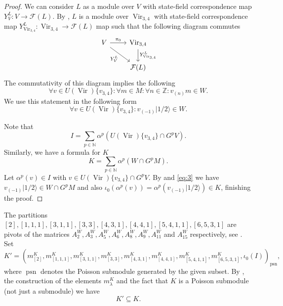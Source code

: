 \documentclass[12pt, a4paper]{article}
\DeclareMathOperator{\Vir}{Vir}
\DeclareMathOperator{\psn}{psn}
\newcommand{\vachalf}{|1/2\rangle}
\begin{document}
\begin{proof}
  We can consider $L$ as a module over $V$ with state-field correspondence map $Y^L_{V}: V \to \mathcal{F}(L)$.
  By \cite[Theorem 4.2.]{wang_rationality_1993}, $L$ is a module over $\Vir_{3,4}$ with state-field correspondence map $Y^L_{\Vir_{3, 4}}: \Vir_{3, 4} \to \mathcal{F}(L)$ map such that the following diagram commutes
  \begin{equation*}
    \begin{tikzcd}
      V \arrow[r, "\pi_0"] \arrow[rd, "{Y^{L}_{V}}"'] & {\Vir_{3, 4}} \arrow[d, "{Y^{L}_{\Vir_{3, 4}}}"] \\
      & {\mathcal{F}(L)}
    \end{tikzcd}
  \end{equation*}
  The commutativity of this diagram implies the following
  \begin{equation*}
    \forall v\in U(\Vir)\{v_{3, 4}\}: \forall m \in M: \forall n \in \mathbb{Z}: v_{(n)}m \in W.
  \end{equation*}
  We use this statement in the following form
  \begin{equation}
    \label{eq:3}
    \forall v \in U(\Vir)\{v_{3, 4}\}: v_{(-1)}\vachalf \in W.
  \end{equation}
  
  Note that
  \begin{equation*}
    I = \sum_{p \in \mathbb{N}}\alpha^p(U(\Vir)\{v_{3, 4}\} \cap G^pV).
  \end{equation*}
  Similarly, we have a formula for $K$
  \begin{equation*}
    K = \sum_{p \in \mathbb{N}}\alpha^p(W \cap G^pM).
  \end{equation*}
  Let $\alpha^p(v) \in I$ with $v \in U(\Vir)\{v_{3, 4}\} \cap G^pV$.
  By  and \eqref{eq:3} we have $v_{(-1)}\vachalf \in W \cap G^pM$ and also $\iota_0(\alpha^p(v)) = \alpha^p(v_{(-1)}\vachalf) \in K$, finishing the proof.  
\end{proof}

The partitions $[2], [1, 1, 1], [3, 1, 1], [3, 3], [4, 3, 1], [4, 4, 1], [5, 4, 1, 1], [6, 5, 3, 1]$ are pivots of the matrices $A^W_2, A^W_3, A^W_5, A^W_6, A^W_8, A^W_9, A^W_{11}$ and $A^W_{15}$ respectively, see .
Set
\begin{equation*}
  K' = (m^K_{[2]}, m^K_{[1, 1, 1]}, m^K_{[3, 1, 1]}, m^K_{[3, 3]}, m^K_{[4, 3, 1]}, m^K_{[4, 4, 1]}, m^K_{[5, 4, 1, 1]}, m^K_{[6, 5, 3, 1]}, \iota_0(I))_{\psn},
\end{equation*}
where $\psn$ denotes the Poisson submodule generated by the given subset.
By , the construction of the elements $m^K_\lambda$ and the fact that $K$ is a Poisson submodule (not just a submodule) we have
\begin{equation*}
K' \subseteq K.
\end{equation*}
\end{document}
